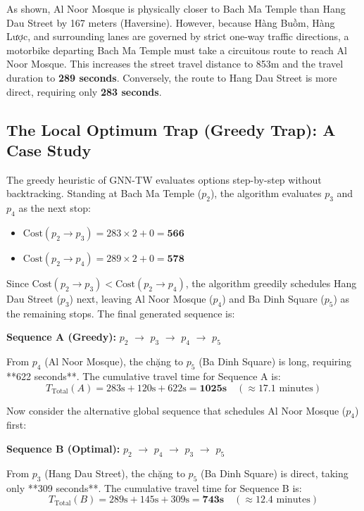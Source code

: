 As shown, Al Noor Mosque is physically closer to Bach Ma Temple than Hang Dau Street by 167 meters (Haversine). However, because Hàng Buồm, Hàng Lược, and surrounding lanes are governed by strict one-way traffic directions, a motorbike departing Bach Ma Temple must take a circuitous route to reach Al Noor Mosque. This increases the street travel distance to 853m and the travel duration to \textbf{289 seconds}. Conversely, the route to Hang Dau Street is more direct, requiring only \textbf{283 seconds}.

\subsection{The Local Optimum Trap (Greedy Trap): A Case Study}

The greedy heuristic of GNN-TW evaluates options step-by-step without backtracking. Standing at Bach Ma Temple ($p_2$), the algorithm evaluates $p_3$ and $p_4$ as the next stop:
\begin{itemize}
    \item $\text{Cost}(p_2 \to p_3) = 283 \times 2 + 0 = \mathbf{566}$
    \item $\text{Cost}(p_2 \to p_4) = 289 \times 2 + 0 = \mathbf{578}$
\end{itemize}
Since $\text{Cost}(p_2 \to p_3) < \text{Cost}(p_2 \to p_4)$, the algorithm greedily schedules Hang Dau Street ($p_3$) next, leaving Al Noor Mosque ($p_4$) and Ba Dinh Square ($p_5$) as the remaining stops. The final generated sequence is:
\begin{center}
\textbf{Sequence A (Greedy):} $p_2$ $\to$ $p_3$ $\to$ $p_4$ $\to$ $p_5$
\end{center}
From $p_4$ (Al Noor Mosque), the chặng to $p_5$ (Ba Dinh Square) is long, requiring **622 seconds**. The cumulative travel time for Sequence A is:
\begin{equation}
T_{\text{Total}}(A) = 283\text{s} + 120\text{s} + 622\text{s} = \mathbf{1025\text{s}} \quad (\approx 17.1 \text{ minutes})
\end{equation}

Now consider the alternative global sequence that schedules Al Noor Mosque ($p_4$) first:
\begin{center}
\textbf{Sequence B (Optimal):} $p_2$ $\to$ $p_4$ $\to$ $p_3$ $\to$ $p_5$
\end{center}
From $p_3$ (Hang Dau Street), the chặng to $p_5$ (Ba Dinh Square) is direct, taking only **309 seconds**. The cumulative travel time for Sequence B is:
\begin{equation}
T_{\text{Total}}(B) = 289\text{s} + 145\text{s} + 309\text{s} = \mathbf{743\text{s}} \quad (\approx 12.4 \text{ minutes})
\end{equation}


